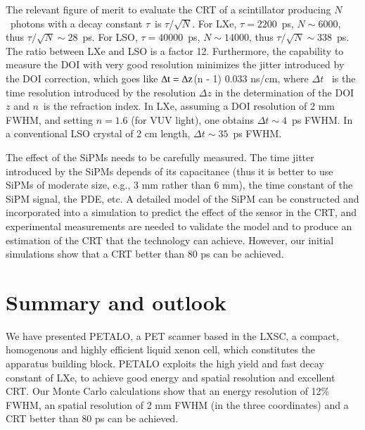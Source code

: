 \documentclass[review]{elsarticle}
\begin{document}
The relevant figure of merit to evaluate the CRT of a scintillator producing $N$~photons with a decay constant $\tau$~is $\tau/\sqrt{N}$. For LXe, $\tau=2200$~ps, $N \sim 6000$, thus 
$\tau/\sqrt{N} \sim 28$~ps. For LSO, $\tau=40000$~ps, $N \sim 14000$, thus 
$\tau/\sqrt{N} \sim 338$~ps. The ratio between LXe and LSO is a factor 12. 
Furthermore, the capability to measure the DOI with very good resolution minimizes the jitter introduced by the DOI correction, which goes like
${\rm \Delta t = \Delta z}$(n - 1) 0.033 ns/cm, where $\Delta t$~ is the time resolution introduced by the resolution $\Delta z$ in the determination of the DOI $z$ and $n$~is the refraction index. In LXe, assuming a DOI resolution of 2 mm FWHM, and setting $n=1.6$ (for VUV light), one obtains $\Delta t \sim 4$~ps FWHM. In a conventional LSO crystal of 2 cm length, $\Delta t \sim 35$~ps FWHM.

The effect of the SiPMs needs to be carefully measured. The time jitter introduced by the SiPMs depends of its capacitance (thus it is better to use SiPMs of moderate size, e.g., 3 mm rather than 6 mm), the time constant of the SiPM signal, the PDE, etc. A detailed model of the SiPM can be constructed and incorporated into a simulation to predict the effect of the sensor in the CRT, and experimental measurements are needed to validate the model and to produce an estimation of the CRT that the technology can achieve. However, our initial simulations show that a CRT better than 80 ps can be achieved. 


\section{Summary and outlook}\label{sec.conclu}
We have presented PETALO, a PET scanner based in the LXSC, a compact, homogenous and highly efficient liquid xenon cell, which constitutes the apparatus building block. PETALO exploits the high yield and fast decay constant of LXe, to achieve good energy and spatial resolution and excellent CRT. Our Monte Carlo calculations show that an energy resolution of 12\% FWHM, an spatial resolution of 2 mm FWHM (in the three coordinates) and a CRT better than 80 ps can be achieved. 
\end{document}
